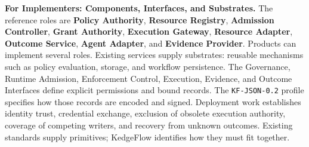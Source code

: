 \medskip
\noindent\textbf{For Implementers: Components, Interfaces, and Substrates.}
The reference roles are \textbf{Policy Authority}, \textbf{Resource Registry}, \textbf{Admission Controller}, \textbf{Grant Authority}, \textbf{Execution Gateway}, \textbf{Resource Adapter}, \textbf{Outcome Service}, \textbf{Agent Adapter}, and \textbf{Evidence Provider}. Products can implement several roles. Existing services supply substrates: reusable mechanisms such as policy evaluation, storage, and workflow persistence. The Governance, Runtime Admission, Enforcement Control, Execution, Evidence, and Outcome Interfaces define explicit permissions and bound records. The \texttt{KF-JSON-0.2} profile specifies how those records are encoded and signed. Deployment work establishes identity trust, credential exchange, exclusion of obsolete execution authority, coverage of competing writers, and recovery from unknown outcomes. Existing standards supply primitives; KedgeFlow identifies how they must fit together.
